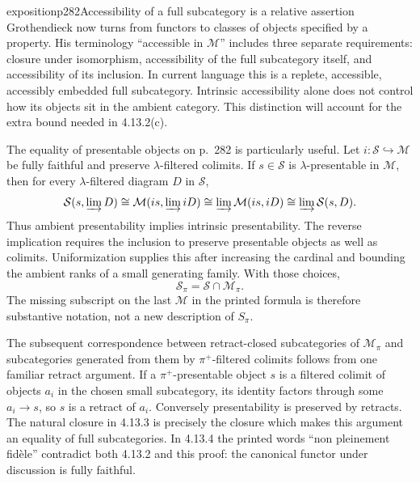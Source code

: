 \begin{dcomment}{exposition}{p282}{Accessibility of a full subcategory is a relative assertion}
Grothendieck now turns from functors to classes of objects specified by a property. His terminology ``accessible in $\mathcal M$'' includes three separate requirements: closure under isomorphism, accessibility of the full subcategory itself, and accessibility of its inclusion. In current language this is a replete, accessible, accessibly embedded full subcategory. Intrinsic accessibility alone does not control how its objects sit in the ambient category. This distinction will account for the extra bound needed in 4.13.2(c).

The equality of presentable objects on p.~282 is particularly useful. Let $i:\mathcal S\hookrightarrow\mathcal M$ be fully faithful and preserve $\lambda$-filtered colimits. If $s\in\mathcal S$ is $\lambda$-presentable in $\mathcal M$, then for every $\lambda$-filtered diagram $D$ in $\mathcal S$,
\[
 \mathcal S(s,\varinjlim D)
 \cong\mathcal M(is,\varinjlim iD)
 \cong\varinjlim\mathcal M(is,iD)
 \cong\varinjlim\mathcal S(s,D).
\]
Thus ambient presentability implies intrinsic presentability. The reverse implication requires the inclusion to preserve presentable objects as well as colimits. Uniformization supplies this after increasing the cardinal and bounding the ambient ranks of a small generating family. With those choices,
\[
 \mathcal S_\pi=\mathcal S\cap\mathcal M_\pi.
\]
The missing subscript on the last $\mathcal M$ in the printed formula is therefore substantive notation, not a new description of $S_\pi$.

The subsequent correspondence between retract-closed subcategories of $\mathcal M_\pi$ and subcategories generated from them by $\pi^+$-filtered colimits follows from one familiar retract argument. If a $\pi^+$-presentable object $s$ is a filtered colimit of objects $a_i$ in the chosen small subcategory, its identity factors through some $a_i\to s$, so $s$ is a retract of $a_i$. Conversely presentability is preserved by retracts. The natural closure in 4.13.3 is precisely the closure which makes this argument an equality of full subcategories. In 4.13.4 the printed words ``non pleinement fid\`ele'' contradict both 4.13.2 and this proof: the canonical functor under discussion is fully faithful.
\end{dcomment}

